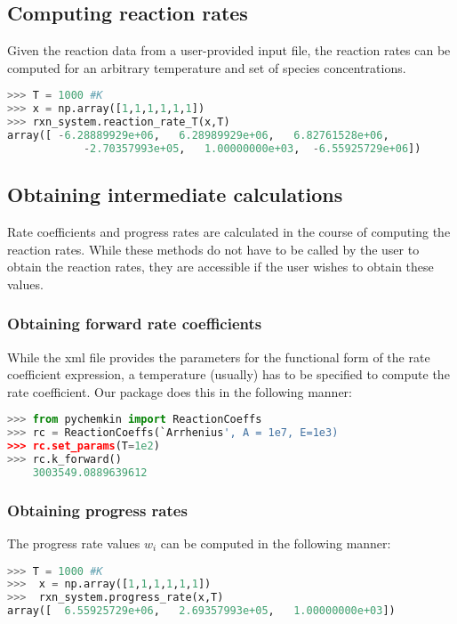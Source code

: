\documentclass[12pt]{article}
\begin{document}
\subsection{Computing reaction rates}
Given the reaction data from a user-provided input file, the reaction rates can be computed for an arbitrary temperature and set of species concentrations.

\begin{lstlisting}[language = Python, basicstyle = \ttfamily,columns = fullflexible, showstringspaces = False]
>>> T = 1000 #K
>>> x = np.array([1,1,1,1,1,1])
>>> rxn_system.reaction_rate_T(x,T)
array([ -6.28889929e+06,   6.28989929e+06,   6.82761528e+06,
            -2.70357993e+05,   1.00000000e+03,  -6.55925729e+06])
\end{lstlisting}

\subsection{Obtaining intermediate calculations}
Rate coefficients and progress rates are calculated in the course of computing the reaction rates. While these methods do not have to be called by the user to obtain the reaction rates, they are accessible if the user wishes to obtain these values. 

\subsubsection{Obtaining forward rate coefficients}
While the xml file provides the parameters for the functional form of the rate coefficient expression, a temperature (usually) has to be specified to compute the rate coefficient. Our package does this in the following manner:

\begin{lstlisting}[language = Python, basicstyle = \ttfamily,columns = fullflexible, showstringspaces = False]
>>> from pychemkin import ReactionCoeffs
>>> rc = ReactionCoeffs(`Arrhenius', A = 1e7, E=1e3)
>>> rc.set_params(T=1e2)
>>> rc.k_forward()
    3003549.0889639612
\end{lstlisting}


\subsubsection{Obtaining progress rates}
The progress rate values $w_i$ can be computed in the following manner:
\begin{lstlisting}[language = Python, basicstyle = \ttfamily,columns = fullflexible, showstringspaces = False]
>>> T = 1000 #K
>>>  x = np.array([1,1,1,1,1,1])
>>>  rxn_system.progress_rate(x,T)
array([  6.55925729e+06,   2.69357993e+05,   1.00000000e+03])
\end{lstlisting}
\end{document}

